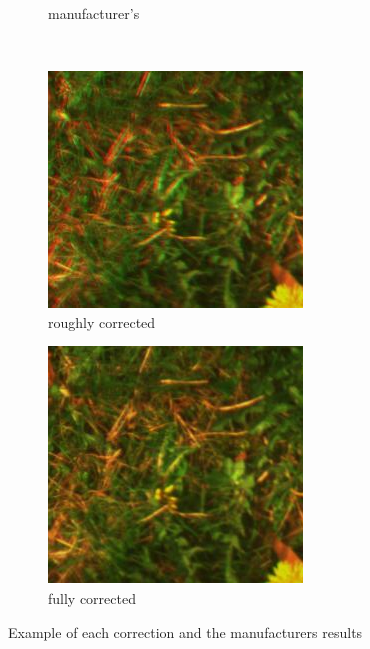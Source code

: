 \documentclass[a4paper,twoside]{article}
\begin{document}
\begin{figure}[ht]
\begin{subfigure}[b]{0.2\textwidth}
			\caption{manufacturer's}
			\label{fig:merged-correction-manufacturer}
		\end{subfigure}
		\\ \vspace{1em}
		\begin{subfigure}[b]{0.2\textwidth}
			\centering
			\includegraphics[width=\linewidth]{../figures/results-affine}
			\caption{roughly corrected}
			\label{fig:merged-correction-affine}
		\end{subfigure}
		\begin{subfigure}[b]{0.2\textwidth}
			\centering
			\includegraphics[width=\linewidth]{../figures/results-perspective}
			\caption{fully corrected}
			\label{fig:merged-correction-perspective}
		\end{subfigure}
	
		\caption{Example of each correction and the manufacturers results}
		\label{fig:merged-correction}
	\end{figure}
	
\end{document}
